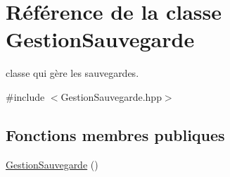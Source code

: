\hypertarget{class_gestion_sauvegarde}{}\section{Référence de la classe Gestion\+Sauvegarde}
\label{class_gestion_sauvegarde}


classe qui gère les sauvegardes.  




{\ttfamily \#include $<$Gestion\+Sauvegarde.\+hpp$>$}

\subsection*{Fonctions membres publiques}
\begin{DoxyCompactItemize}
\item 
\hyperlink{class_gestion_sauvegarde_aa1501596c822ab6230fd224b74308762}{Gestion\+Sauvegarde} ()\hypertarget{class_gestion_sauvegarde_aa1501596c822ab6230fd224b74308762}{}\label{class_gestion_sauvegarde_aa1501596c822ab6230fd224b74308762}


\end{DoxyCompactItemize}
